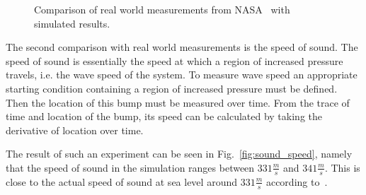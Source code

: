 \begin{figure}[!h]
    \caption{Comparison of real world measurements from NASA~\cite{larson1963stratosphere} with simulated results.}
    \label{fig:cmp_nasa}
\end{figure}

The second comparison with real world measurements is the speed of sound.
The speed of sound is essentially the speed at which a region of increased pressure travels, i.e. the wave speed of the system.
To measure wave speed an appropriate starting condition containing a region of increased pressure must be defined.
Then the location of this bump must be measured over time.
From the trace of time and location of the bump, its speed can be calculated by taking the derivative of location over time.

The result of such an experiment can be seen in Fig.~\ref{fig:sound_speed}, namely that the speed of sound in the simulation ranges between $331\frac{m}{s}$ and $341\frac{m}{s}$.
This is close to the actual speed of sound at sea level around $331\frac{m}{s}$ according to~\cite{hardy1942velocity}.

